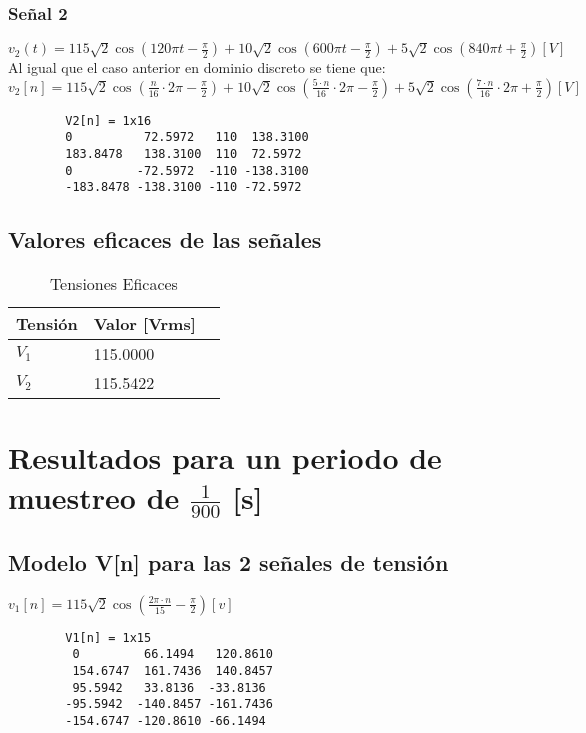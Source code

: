 \documentclass[conference]{IEEEtran}
\theoremstyle{mytheoremstyle}
\theoremstyle{mytheoremstyle}
\theoremstyle{myproblemstyle}
\begin{document}
        \subsubsection{Señal 2}
        $v_2(t) = 115\sqrt{2} \cos(120 \pi t - \frac{\pi}{2}) + 10 \sqrt{2} \cos(600 \pi t - \frac{\pi}{2}) + 5 \sqrt{2} \cos(840 \pi t + \frac{\pi}{2}) [V]$
        \\ Al igual que el caso anterior en dominio discreto se tiene que:  
        $v_2[n] = 115\sqrt{2} \cos(\frac{n}{16}\cdot 2\pi- \frac{\pi}{2}) + 10 \sqrt{2} \cos(\frac{5 \cdot n}{16}\cdot 2\pi - \frac{\pi}{2}) + 5 \sqrt{2} \cos(\frac{7 \cdot n}{16}\cdot 2\pi + \frac{\pi}{2}) [V]$
        \begin{verbatim}
        V2[n] = 1x16    
        0          72.5972   110  138.3100  
        183.8478   138.3100  110  72.5972    
        0         -72.5972  -110 -138.3100
        -183.8478 -138.3100 -110 -72.5972
        \end{verbatim}

        \subsection{Valores eficaces de las señales}
        \begin{table}[h]
        \centering
        \caption{Tensiones Eficaces}
        \begin{tabular}{@{}lll@{}}
            \toprule
            Tensión & Valor [Vrms] \\ \midrule
            $V_1$   & 115.0000     \\
            $V_2$   & 115.5422     \\ \bottomrule
        \end{tabular}
        \label{tab:tensiones}
        \end{table}

        \section{Resultados para un periodo de muestreo de \texorpdfstring{$\frac{1}{900}$}{1/900} [s]}



    \subsection{Modelo V[n] para las 2 señales de tensión}
        $v_1[n] = 115\sqrt{2} \cos(\frac{2\pi \cdot n}{15}   - \frac{\pi}{2}) [v]$
        \begin{verbatim}
        V1[n] = 1x15    
         0         66.1494   120.8610  
         154.6747  161.7436  140.8457   
         95.5942   33.8136  -33.8136  
        -95.5942  -140.8457 -161.7436 
        -154.6747 -120.8610 -66.1494 
        \end{verbatim}
\end{document}
